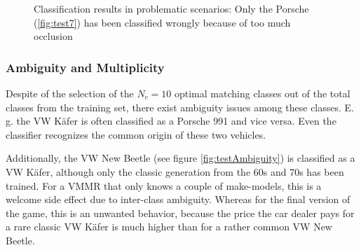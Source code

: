 \begin{figure}[btph]
         \quad
        \caption[Classification results in problematic scenarios: Only the Porsche (\ref{fig:test7}) has been classified wrongly because of too much occlusion]{Classification results in problematic scenarios: Only the Porsche (\ref{fig:test7}) has been classified wrongly because of too much occlusion}
\label{fig:tests}
\end{figure}

\subsubsection{Ambiguity and Multiplicity}
Despite of the selection of the $N_c = 10$ optimal matching classes out of the total classes from the training set, there exist ambiguity issues among these classes. E. g. the VW K\"afer is often classified as a Porsche 991 and vice versa. Even the classifier recognizes the common origin of these two vehicles.

Additionally, the VW New Beetle (see figure \ref{fig:testAmbiguity}) is classified as a VW K\"afer, although only the classic generation from the 60s and 70s has been trained. For a VMMR that only knows a couple of make-models, this is a welcome side effect due to inter-class ambiguity. Whereas for the final version of the game, this is an unwanted behavior, because the price the car dealer pays for a rare classic VW K\"afer is much higher than for a rather common VW New Beetle.

